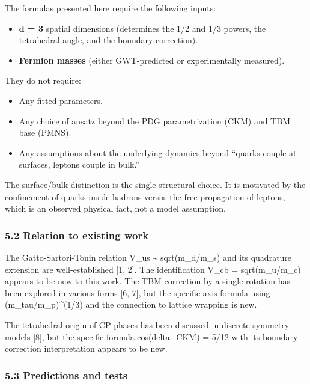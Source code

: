 \documentclass[
]{article}
\providecommand{\tightlist}{%
  \setlength{\itemsep}{0pt}\setlength{\parskip}{0pt}}
\begin{document}
The formulas presented here require the following inputs:

\begin{itemize}
\tightlist
\item
  \textbf{d = 3} spatial dimensions (determines the 1/2 and 1/3 powers,
  the tetrahedral angle, and the boundary correction).
\item
  \textbf{Fermion masses} (either GWT-predicted or experimentally
  measured).
\end{itemize}

They do not require:

\begin{itemize}
\tightlist
\item
  Any fitted parameters.
\item
  Any choice of ansatz beyond the PDG parametrization (CKM) and TBM base
  (PMNS).
\item
  Any assumptions about the underlying dynamics beyond ``quarks couple
  at surfaces, leptons couple in bulk.''
\end{itemize}

The surface/bulk distinction is the single structural choice. It is
motivated by the confinement of quarks inside hadrons versus the free
propagation of leptons, which is an observed physical fact, not a model
assumption.

\subsubsection{5.2 Relation to existing
work}\label{relation-to-existing-work}

The Gatto-Sartori-Tonin relation V\_us \textasciitilde{} sqrt(m\_d/m\_s)
and its quadrature extension are well-established {[}1, 2{]}. The
identification V\_cb = sqrt(m\_u/m\_c) appears to be new to this work.
The TBM correction by a single rotation has been explored in various
forms {[}6, 7{]}, but the specific axis formula using
(m\_tau/m\_p)\^{}(1/3) and the connection to lattice wrapping is new.

The tetrahedral origin of CP phases has been discussed in discrete
symmetry models {[}8{]}, but the specific formula cos(delta\_CKM) = 5/12
with its boundary correction interpretation appears to be new.

\subsubsection{5.3 Predictions and tests}\label{predictions-and-tests}
\end{document}
